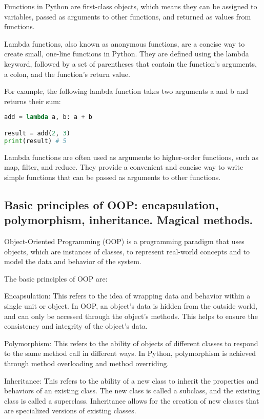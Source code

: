 \documentclass[12pt, a4paper, oneside]{article}
\begin{document}
Functions in Python are first-class objects, which means they can be assigned to variables, passed as arguments to other functions, and returned as values from functions.

Lambda functions, also known as anonymous functions, are a concise way to create small, one-line functions in Python. They are defined using the lambda keyword, followed by a set of parentheses that contain the function's arguments, a colon, and the function's return value.

For example, the following lambda function takes two arguments a and b and returns their sum:

\begin{lstlisting}[language=Python, frame=single]
add = lambda a, b: a + b

result = add(2, 3)
print(result) # 5
\end{lstlisting}

Lambda functions are often used as arguments to higher-order functions, such as map, filter, and reduce. They provide a convenient and concise way to write simple functions that can be passed as arguments to other functions.

\subsection{ Basic principles of OOP: encapsulation, polymorphism, inheritance. Magical methods. }
Object-Oriented Programming (OOP) is a programming paradigm that uses objects, which are instances of classes, to represent real-world concepts and to model the data and behavior of the system.

The basic principles of OOP are:

Encapsulation: This refers to the idea of wrapping data and behavior within a single unit or object. In OOP, an object's data is hidden from the outside world, and can only be accessed through the object's methods. This helps to ensure the consistency and integrity of the object's data.

Polymorphism: This refers to the ability of objects of different classes to respond to the same method call in different ways. In Python, polymorphism is achieved through method overloading and method overriding.

Inheritance: This refers to the ability of a new class to inherit the properties and behaviors of an existing class. The new class is called a subclass, and the existing class is called a superclass. Inheritance allows for the creation of new classes that are specialized versions of existing classes.
\end{document}
